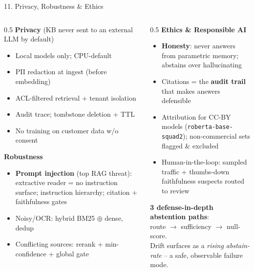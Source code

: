 \documentclass[10pt,aspectratio=169]{beamer}
\begin{document}
\begin{frame}{11. Privacy, Robustness \& Ethics}
\begin{columns}[T]
\begin{column}{0.5\textwidth}
\textbf{Privacy} (KB never sent to an external LLM by default)
\begin{itemize}\scriptsize
  \item Local models only; CPU-default
  \item PII redaction at ingest (before embedding)
  \item ACL-filtered retrieval + tenant isolation
  \item Audit trace; tombstone deletion + TTL
  \item No training on customer data w/o consent
\end{itemize}

\textbf{Robustness}
\begin{itemize}\scriptsize
  \item \textbf{Prompt injection} (top RAG threat): extractive reader = no instruction surface; instruction hierarchy; citation + faithfulness gates
  \item Noisy/OCR: hybrid BM25 $\oplus$ dense, dedup
  \item Conflicting sources: rerank + min-confidence + global gate
\end{itemize}
\end{column}
\begin{column}{0.5\textwidth}
\textbf{Ethics \& Responsible AI}
\begin{itemize}\scriptsize
  \item \textbf{Honesty}: never answers from parametric memory; abstains over hallucinating
  \item Citations = the \textbf{audit trail} that makes answers defensible
  \item Attribution for CC-BY models (\texttt{roberta-base-squad2}); non-commercial sets flagged \& excluded
  \item Human-in-the-loop: sampled traffic + thumbs-down faithfulness suspects routed to review
\end{itemize}

\vspace{0.1cm}
\centering
\textbf{3 defense-in-depth abstention paths}: \\ route $\rightarrow$ sufficiency $\rightarrow$ null-score.\\
Drift surfaces as a \emph{rising abstain-rate} -- a safe, observable failure mode.
\end{column}
\end{columns}
\end{frame}
\end{document}
